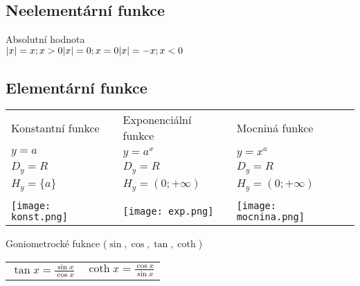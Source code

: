 \subsection*{Neelementární funkce}
Absolutní hodnota \\
\(
    \lvert x\rvert = x ; x > 0 \\
    \lvert x\rvert = 0 ; x = 0 \\
    \lvert x\rvert = -x ; x < 0
\)
    \subsection*{Elementární funkce}
\begin{tabular}{p{6cm} p{6cm} p{6cm}}
    Konstantní funkce & Exponenciální funkce & Mocniná funkce \\
    $y = a$ & $y = a^x$ & $y = x^a$ \\
    $D_y=R$ & $D_y = R$ & $D_y = R$ \\
    $H_y = \{a\}$ & $H_y = (0;+\infty)$ & $H_y = (0;+\infty)$ \\ \\
    \texttt{[image: konst.png]}&
    \texttt{[image: exp.png]}&
    \texttt{[image: mocnina.png]} \\

\end{tabular}

Goniometrocké fuknce
($\sin{},\cos{},\tan{}, \coth{}$)
 
\begin{center}
    \begin{tabular}{p{5cm} p{5cm}}
        \(\tan{x}=\frac{\sin{x}}{\cos{x}} \)&
        \(\coth{x}=\frac{\cos{x}}{\sin{x}} \) \\
    \end{tabular}
\end{center}
